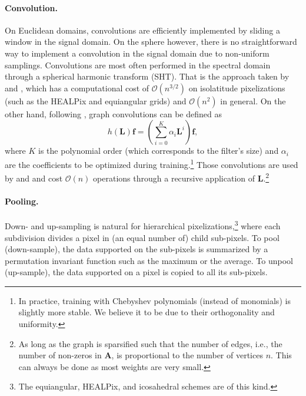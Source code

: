 \documentclass{article} %
\renewcommand{\b}[1]{{\bm{#1}}}  %
\newcommand{\bO}{\mathcal{O}}
\begin{document}
\paragraph{Convolution.} \label{sec:method:convolution}
On Euclidean domains, convolutions are efficiently implemented by sliding a window in the signal domain.
On the sphere however, there is no straightforward way to implement a convolution in the signal domain due to non-uniform samplings.
Convolutions are most often performed in the spectral domain through a spherical harmonic transform (SHT).
That is the approach taken by \citet{cohen2018sphericalcnn} and \citet{esteves2018sphericalcnn}, which has a computational cost of $\bO(n^{3/2})$ on isolatitude pixelizations (such as the HEALPix and equiangular grids) and $\bO(n^2)$ in general.
On the other hand, following \citet{defferrard2016graphnn}, graph convolutions can be defined as
\begin{equation} \label{eqn:graph_conv}
	h(\b{L}) \b{f} = \left(\sum_{i=0}^K \alpha_i \b{L}^i\right) \b{f},
\end{equation}
where $K$ is the polynomial order (which corresponds to the filter's size) and $\alpha_i$ are the coefficients to be optimized during training.\footnote{In practice, training with Chebyshev polynomials (instead of monomials) is slightly more stable. We believe it to be due to their orthogonality and uniformity.}
Those convolutions are used by \citet{khasanova2017sphericalcnn} and \citet{perraudin2019deepspherecosmo} and cost $\bO(n)$ operations through a recursive application of $\b{L}$.\footnote{As long as the graph is sparsified such that the number of edges, i.e., the number of non-zeros in $\b{A}$, is proportional to the number of vertices $n$. This can always be done as most weights are very small.}

\paragraph{Pooling.}
Down- and up-sampling is natural for hierarchical pixelizations,\footnote{The equiangular, HEALPix, and icosahedral schemes are of this kind.} where each subdivision divides a pixel in (an equal number of) child sub-pixels.
To pool (down-sample), the data supported on the sub-pixels is summarized by a permutation invariant function such as the maximum or the average.
To unpool (up-sample), the data supported on a pixel is copied to all its sub-pixels.
\end{document}
